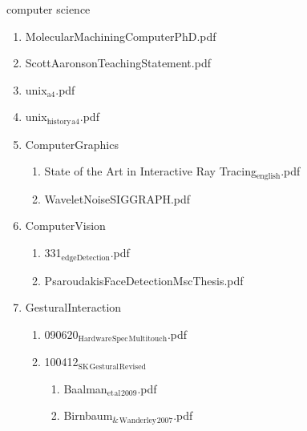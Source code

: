 \documentclass[11pt]{article}
\begin{document}
\item computer science
\label{sec-1-1-1-1-15}
\begin{enumerate}
\item MolecularMachiningComputerPhD.pdf
\label{sec-1-1-1-1-15-1}

\item ScottAaronsonTeachingStatement.pdf
\label{sec-1-1-1-1-15-2}

\item unix$_{\text{a4}}$.pdf
\label{sec-1-1-1-1-15-3}

\item unix$_{\text{history}}$$_{\text{a4}}$.pdf
\label{sec-1-1-1-1-15-4}

\item ComputerGraphics
\label{sec-1-1-1-1-15-5}
\begin{enumerate}
\item State of the Art in Interactive Ray Tracing$_{\text{english}}$.pdf
\label{sec-1-1-1-1-15-5-1}

\item WaveletNoiseSIGGRAPH.pdf
\label{sec-1-1-1-1-15-5-2}
\end{enumerate}

\item ComputerVision
\label{sec-1-1-1-1-15-6}
\begin{enumerate}
\item 331$_{\text{edgeDetection}}$.pdf
\label{sec-1-1-1-1-15-6-1}

\item PsaroudakisFaceDetectionMscThesis.pdf
\label{sec-1-1-1-1-15-6-2}
\end{enumerate}

\item GesturalInteraction
\label{sec-1-1-1-1-15-7}
\begin{enumerate}
\item 090620$_{\text{Hardware}}$$_{\text{Spec}}$$_{\text{Multitouch}}$.pdf
\label{sec-1-1-1-1-15-7-1}

\item 100412$_{\text{SK}}$$_{\text{Gestural}}$$_{\text{Revised}}$
\label{sec-1-1-1-1-15-7-2}
\begin{enumerate}
\item Baalman$_{\text{et}}$$_{\text{al}}$$_{\text{2009}}$.pdf
\label{sec-1-1-1-1-15-7-2-1}

\item Birnbaum$_{\text{\&}}$$_{\text{Wanderley}}$$_{\text{2007}}$.pdf
\label{sec-1-1-1-1-15-7-2-2}


\end{enumerate}
\end{enumerate}
\end{enumerate}
\end{document}
